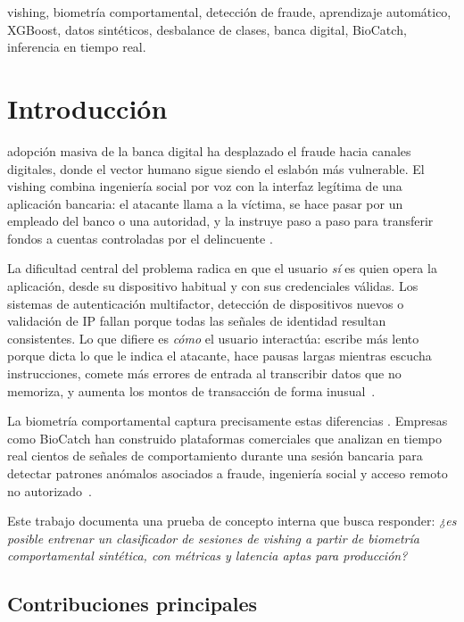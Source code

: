 \documentclass[journal]{IEEEtran}
\begin{document}
\begin{IEEEkeywords}
vishing, biometría comportamental, detección de fraude, aprendizaje automático,
XGBoost, datos sintéticos, desbalance de clases, banca digital, BioCatch,
inferencia en tiempo real.
\end{IEEEkeywords}

\section{Introducción}
\label{sec:intro}

 adopción masiva de la banca digital ha desplazado el
fraude hacia canales digitales, donde el vector humano sigue siendo el eslabón
más vulnerable. El vishing combina ingeniería social por voz con la interfaz
legítima de una aplicación bancaria: el atacante llama a la víctima, se
hace pasar por un empleado del banco o una autoridad, y la instruye paso a
paso para transferir fondos a cuentas controladas por el delincuente
\cite{mitnick2002art, jagatic2007social}.

La dificultad central del problema radica en que el usuario \emph{sí} es
quien opera la aplicación, desde su dispositivo habitual y con sus
credenciales válidas. Los sistemas de autenticación multifactor, detección
de dispositivos nuevos o validación de IP fallan porque todas las señales
de identidad resultan consistentes. Lo que difiere es \emph{cómo} el usuario
interactúa: escribe más lento porque dicta lo que le indica el atacante,
hace pausas largas mientras escucha instrucciones, comete más errores de
entrada al transcribir datos que no memoriza, y aumenta los montos de
transacción de forma inusual~\cite{threatfabric2023}.

La biometría comportamental captura precisamente estas diferencias
\cite{shen2007application, sundararajan2020behavioral}. Empresas como
BioCatch han construido plataformas comerciales que analizan en tiempo real
cientos de señales de comportamiento durante una sesión bancaria para
detectar patrones anómalos asociados a fraude, ingeniería social y acceso
remoto no autorizado~\cite{biocatch2022}.

Este trabajo documenta una prueba de concepto interna que busca responder:
\emph{¿es posible entrenar un clasificador de sesiones de vishing a partir de
biometría comportamental sintética, con métricas y latencia aptas para
producción?}

\subsection*{Contribuciones principales}
\end{document}

